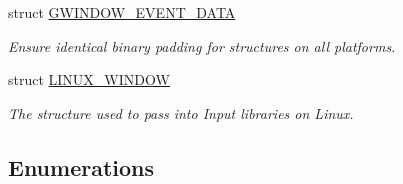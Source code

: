 \begin{DoxyCompactItemize}
struct \hyperlink{structGW_1_1SYSTEM_1_1GWINDOW__EVENT__DATA}{G\+W\+I\+N\+D\+O\+W\+\_\+\+E\+V\+E\+N\+T\+\_\+\+D\+A\+TA}
\begin{DoxyCompactList}\small\item\em Ensure identical binary padding for structures on all platforms. \end{DoxyCompactList}\item 
struct \hyperlink{structGW_1_1SYSTEM_1_1LINUX__WINDOW}{L\+I\+N\+U\+X\+\_\+\+W\+I\+N\+D\+OW}
\begin{DoxyCompactList}\small\item\em The structure used to pass into Input libraries on Linux. \end{DoxyCompactList}\end{DoxyCompactItemize}
\subsection*{Enumerations}
